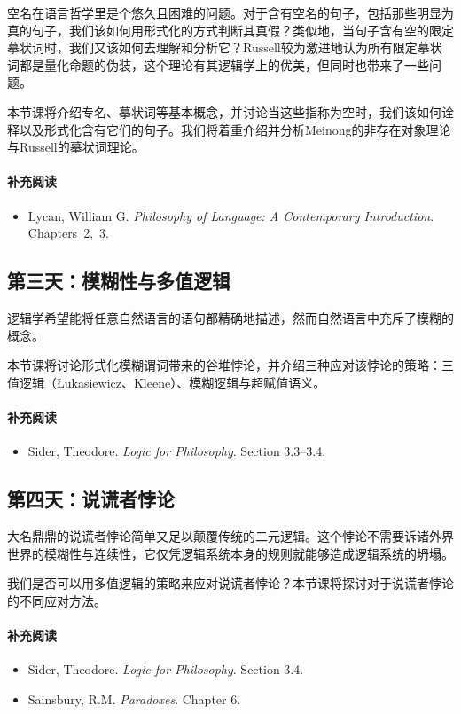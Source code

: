 \documentclass{article}
\begin{document}
空名在语言哲学里是个悠久且困难的问题。对于含有空名的句子，包括那些明显为真的句子，我们该如何用形式化的方式判断其真假？类似地，当句子含有空的限定摹状词时，我们又该如何去理解和分析它？Russell较为激进地认为所有限定摹状词都是量化命题的伪装，这个理论有其逻辑学上的优美，但同时也带来了一些问题。

本节课将介绍专名、摹状词等基本概念，并讨论当这些指称为空时，我们该如何诠释以及形式化含有它们的句子。我们将着重介绍并分析Meinong的非存在对象理论与Russell的摹状词理论。

\paragraph*{补充阅读}
\begin{itemize}
  \item Lycan, William G. \textit{Philosophy of Language: A Contemporary Introduction}. Chapters~2,~3.
\end{itemize}


\subsection*{第三天：模糊性与多值逻辑}

逻辑学希望能将任意自然语言的语句都精确地描述，然而自然语言中充斥了模糊的概念。

本节课将讨论形式化模糊谓词带来的谷堆悖论，并介绍三种应对该悖论的策略：三值逻辑（{\L}ukasiewicz、Kleene）、模糊逻辑与超赋值语义。

\paragraph*{补充阅读}
\begin{itemize}
  \item Sider, Theodore. \textit{Logic for Philosophy}. Section 3.3--3.4.
\end{itemize}


\subsection*{第四天：说谎者悖论}

大名鼎鼎的说谎者悖论简单又足以颠覆传统的二元逻辑。这个悖论不需要诉诸外界世界的模糊性与连续性，它仅凭逻辑系统本身的规则就能够造成逻辑系统的坍塌。

我们是否可以用多值逻辑的策略来应对说谎者悖论？本节课将探讨对于说谎者悖论的不同应对方法。

\paragraph*{补充阅读}
\begin{itemize}
  \item Sider, Theodore. \textit{Logic for Philosophy}. Section 3.4.
  \item Sainsbury, R.M. \textit{Paradoxes}. Chapter 6.
\end{itemize}
\end{document}
